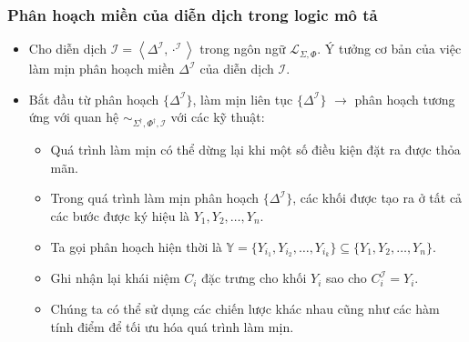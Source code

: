 \documentclass[fleqn]{beamer}
\newcommand{\mL}		{\mathcal{L}}
\newcommand{\mI}		{\mathcal{I}}
\newcommand{\mbY}		{\mathbb{Y}}
\newcommand{\SigmaDag}	{\Sigma^\dag}
\newcommand{\mLSP}		{\mL_{\Sigma,\Phi}}
\newcommand{\simSdPdI}	{\sim_{\SigmaDag,\Phi^\dag,\mI}}
\newcommand{\tuple}[1]	{\left\langle#1\right\rangle\!}
\begin{document}
\begin{frame}\frametitle{\bf Phân hoạch miền của diễn dịch trong logic mô tả}
\begin{itemize}
	\item Cho diễn dịch $\mI = \tuple{\Delta^\mI, \cdot^\mI}$ trong ngôn ngữ $\mLSP$. Ý tưởng cơ bản của việc làm mịn phân hoạch miền $\Delta^\mI$ của diễn dịch $\mI$. 
	\vspace{1.0ex}
	\item Bắt đầu từ phân hoạch $\{\Delta^\mI\}$, làm mịn liên tục $\{\Delta^\mI\}$ $\rightarrow$ phân hoạch tương ứng với quan hệ $\simSdPdI$ với các kỹ thuật:
	\begin{itemize}
		\item Quá trình làm mịn có thể dừng lại khi một số điều kiện đặt ra được thỏa mãn.		
		\vspace{1.0ex}
		\item Trong quá trình làm mịn phân hoạch $\{\Delta^\mI\}$, các khối được tạo ra ở tất cả các bước được ký hiệu là $Y_1, Y_2, \ldots, Y_n$. 
		\vspace{1.0ex}
				
		\item Ta gọi phân hoạch hiện thời là $\mbY = \{Y_{i_1}, Y_{i_2}, \ldots, Y_{i_k}\} \subseteq \{Y_1, Y_2, \ldots, Y_n\}$. 
		\vspace{1.0ex}
				
		\item Ghi nhận lại khái niệm $C_i$ đặc trưng cho khối $Y_i$ sao cho $C_i^\mI = Y_i$.
		\vspace{1.0ex}
				
		\item Chúng ta có thể sử dụng các chiến lược khác nhau cũng như các hàm tính điểm để tối ưu hóa quá trình làm mịn.
	\end{itemize}
\end{itemize}
\end{frame}
\end{document}
